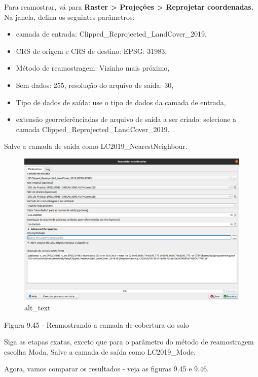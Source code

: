 \documentclass[
  portuguese,
]{krantz}
\providecommand{\tightlist}{%
  \setlength{\itemsep}{0pt}\setlength{\parskip}{0pt}}
\begin{document}
Para reamostrar, vá para \textbf{Raster \textgreater{} Projeções \textgreater{} Reprojetar coordenadas.} Na janela, defina os seguintes parâmetros:

\begin{itemize}
\tightlist
\item
  camada de entrada: Clipped\_Reprojected\_LandCover\_2019,
\item
  CRS de origem e CRS de destino: EPSG: 31983,
\item
  Método de reamostragem: Vizinho mais próximo,
\item
  Sem dados: 255, resolução do arquivo de saída: 30,
\item
  Tipo de dados de saída: use o tipo de dados da camada de entrada,
\item
  extensão georreferênciadas de arquivo de saída a ser criado: selecione a camada Clipped\_Reprojected\_LandCover\_2019.
\end{itemize}

Salve a camada de saída como LC2019\_NearestNeighbour.

\begin{figure}
\centering
\includegraphics{media/modulo9/fig945.png}
\caption{alt\_text}
\end{figure}

Figura 9.45 - Reamostrando a camada de cobertura do solo

Siga as etapas exatas, exceto que para o parâmetro do método de reamostragem escolha Moda. Salve a camada de saída como LC2019\_Mode.

Agora, vamos comparar os resultados - veja as figuras 9.45 e 9.46.
\end{document}
